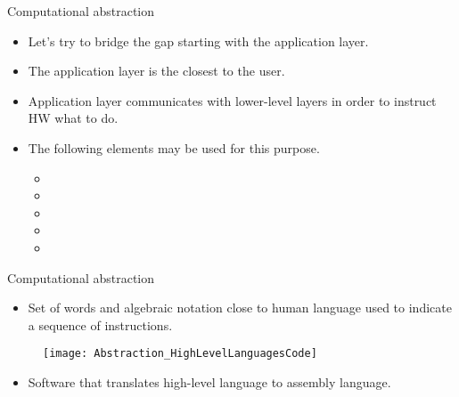 \begin{frame}{Computational abstraction}
\begin{itemize}
\item Let's try to bridge the gap starting with the application layer.
\item The application layer is the closest to the user. 
\item Application layer communicates with lower-level layers in order to instruct \ac{HW} what to do.
\item The following elements may be used for this purpose.
\pauseprint
  \begin{itemize}
  \item {}
  \item {}
  \item {}
  \item {}
  \item {}
  \end{itemize}
\end{itemize}
\end{frame}

\begin{frame}{Computational abstraction}
  \begin{itemize}
  \item {} \pauseprint Set of words and algebraic notation close to human language used to indicate a sequence of instructions.
  \end{itemize}
  \begin{figure}
    \texttt{[image: Abstraction\_HighLevelLanguagesCode]}
  \end{figure}
  \begin{itemize}\pauseprint
  \vspace{-15pt}
    \item {} \pauseprint Software that translates high-level language to assembly language.
    \end{itemize}
\end{frame}

